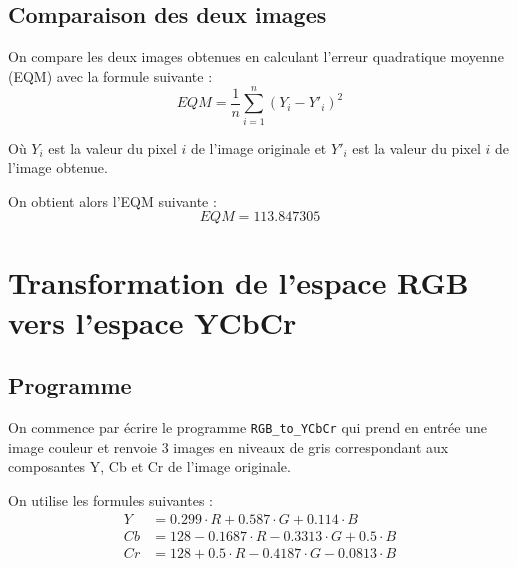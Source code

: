 \documentclass[french,a4paper,10pt]{article}
\begin{document}
    \newpage

    \subsection{Comparaison des deux images}\label{subsec:1.3}

    On compare les deux images obtenues en calculant l'erreur quadratique moyenne
    (EQM) avec la formule suivante :
    \[
        EQM = \frac{1}{n} \sum_{i=1}^{n} (Y_i - Y'_i)^2
    \]

    Où $Y_i$ est la valeur du pixel $i$ de l'image originale et $Y'_i$ est la
    valeur du pixel $i$ de l'image obtenue.

    On obtient alors l'EQM suivante :
    \[
        EQM = 113.847305
    \]

    \newpage
    \section{Transformation de l'espace RGB vers l'espace YCbCr}\label{sec:2}

    \subsection{Programme}\label{subsec:2.1}

    On commence par écrire le programme \texttt{RGB\_to\_YCbCr} qui prend en
    entrée une image couleur et renvoie 3 images en niveaux de gris correspondant
    aux composantes Y, Cb et Cr de l'image originale.

    On utilise les formules suivantes :
    \[\begin{aligned}
            Y &= 0.299 \cdot R + 0.587 \cdot G + 0.114 \cdot B \\
            Cb &= 128 - 0.1687 \cdot R - 0.3313 \cdot G + 0.5 \cdot B \\
            Cr &= 128 + 0.5 \cdot R - 0.4187 \cdot G - 0.0813 \cdot B
    \end{aligned}\]
\end{document}
